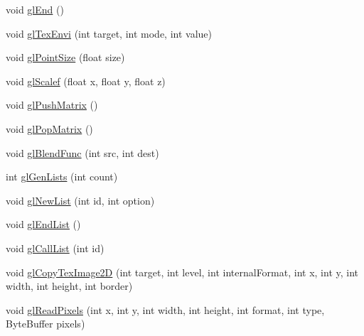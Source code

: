 \begin{DoxyCompactItemize}
\item 
void \mbox{\hyperlink{interfaceorg_1_1newdawn_1_1slick_1_1opengl_1_1renderer_1_1_s_g_l_a7f5666aaa59b12617ab81e1263140f72}{gl\+End}} ()
\item 
void \mbox{\hyperlink{interfaceorg_1_1newdawn_1_1slick_1_1opengl_1_1renderer_1_1_s_g_l_a86e50032d7f9a3e8268fb20e5ce644ee}{gl\+Tex\+Envi}} (int target, int mode, int value)
\item 
void \mbox{\hyperlink{interfaceorg_1_1newdawn_1_1slick_1_1opengl_1_1renderer_1_1_s_g_l_a29b20d7b222979b3edb3f069db9ec467}{gl\+Point\+Size}} (float size)
\item 
void \mbox{\hyperlink{interfaceorg_1_1newdawn_1_1slick_1_1opengl_1_1renderer_1_1_s_g_l_a3af948fb9b1074143a0ce384a2035d02}{gl\+Scalef}} (float x, float y, float z)
\item 
void \mbox{\hyperlink{interfaceorg_1_1newdawn_1_1slick_1_1opengl_1_1renderer_1_1_s_g_l_ae9904a980aa014796bf1dcd748b63056}{gl\+Push\+Matrix}} ()
\item 
void \mbox{\hyperlink{interfaceorg_1_1newdawn_1_1slick_1_1opengl_1_1renderer_1_1_s_g_l_ab8fd54b37e504c0b72d8b18b90c94c41}{gl\+Pop\+Matrix}} ()
\item 
void \mbox{\hyperlink{interfaceorg_1_1newdawn_1_1slick_1_1opengl_1_1renderer_1_1_s_g_l_afa605b9f35a519c10dbed88c79be96af}{gl\+Blend\+Func}} (int src, int dest)
\item 
int \mbox{\hyperlink{interfaceorg_1_1newdawn_1_1slick_1_1opengl_1_1renderer_1_1_s_g_l_a2c623d00bb2450569a6c86a71024b83d}{gl\+Gen\+Lists}} (int count)
\item 
void \mbox{\hyperlink{interfaceorg_1_1newdawn_1_1slick_1_1opengl_1_1renderer_1_1_s_g_l_a85746cd7e0de9297a821619097a5f7cc}{gl\+New\+List}} (int id, int option)
\item 
void \mbox{\hyperlink{interfaceorg_1_1newdawn_1_1slick_1_1opengl_1_1renderer_1_1_s_g_l_a300a1d9b3c984ccc0a59eb951821bf37}{gl\+End\+List}} ()
\item 
void \mbox{\hyperlink{interfaceorg_1_1newdawn_1_1slick_1_1opengl_1_1renderer_1_1_s_g_l_a8482d9603203e93027e90042db3f561a}{gl\+Call\+List}} (int id)
\item 
void \mbox{\hyperlink{interfaceorg_1_1newdawn_1_1slick_1_1opengl_1_1renderer_1_1_s_g_l_a444c1cfd39d478eedbfc5c1022bc11eb}{gl\+Copy\+Tex\+Image2D}} (int target, int level, int internal\+Format, int x, int y, int width, int height, int border)
\item 
void \mbox{\hyperlink{interfaceorg_1_1newdawn_1_1slick_1_1opengl_1_1renderer_1_1_s_g_l_a6a734843b3a3bb87604d439da37f4e74}{gl\+Read\+Pixels}} (int x, int y, int width, int height, int format, int type, Byte\+Buffer pixels)

\end{DoxyCompactItemize}
